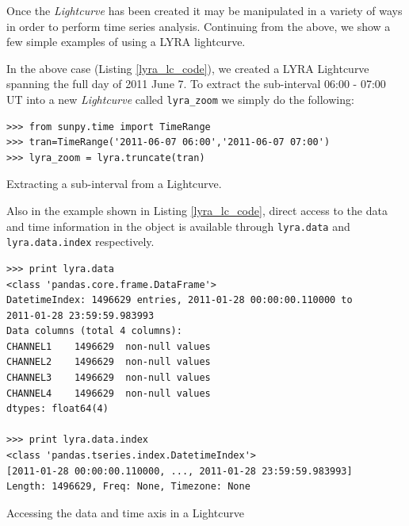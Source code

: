 Once the \textit{Lightcurve} has been created it may be manipulated in a variety of ways in order to perform time series analysis. Continuing from the above, we show a few simple examples of using a LYRA lightcurve. 

In the above case (Listing \ref{lyra_lc_code}), we created a LYRA Lightcurve spanning the full day of 2011 June 7. To extract the sub-interval 06:00 - 07:00 UT into a new \textit{Lightcurve} called \verb|lyra_zoom| we simply do the following:

\begin{listing}[h]
\begin{verbatim}
>>> from sunpy.time import TimeRange
>>> tran=TimeRange('2011-06-07 06:00','2011-06-07 07:00')
>>> lyra_zoom = lyra.truncate(tran)
\end{verbatim}
\label{lyra_truncate}
\caption{Extracting a sub-interval from a Lightcurve.}
\end{listing}

Also in the example shown in Listing \ref{lyra_lc_code}, direct access to the data and time information in the object is available through \verb|lyra.data| and \verb|lyra.data.index| respectively.

\begin{listing}[h]
\begin{verbatim}
>>> print lyra.data
<class 'pandas.core.frame.DataFrame'>
DatetimeIndex: 1496629 entries, 2011-01-28 00:00:00.110000 to 
2011-01-28 23:59:59.983993
Data columns (total 4 columns):
CHANNEL1    1496629  non-null values
CHANNEL2    1496629  non-null values
CHANNEL3    1496629  non-null values
CHANNEL4    1496629  non-null values
dtypes: float64(4)

>>> print lyra.data.index
<class 'pandas.tseries.index.DatetimeIndex'>
[2011-01-28 00:00:00.110000, ..., 2011-01-28 23:59:59.983993]
Length: 1496629, Freq: None, Timezone: None
\end{verbatim}
\label{lyra_pandas}
\caption{Accessing the data and time axis in a Lightcurve}
\end{listing}

